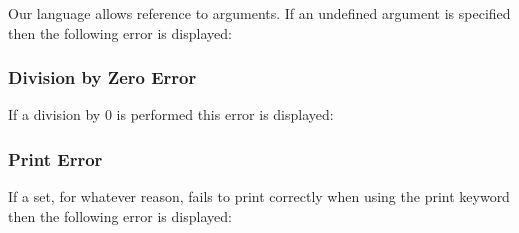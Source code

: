 \documentclass{article}
\begin{document}
Our language allows reference to arguments. If an undefined argument is 
specified then the following error is displayed: \texttt{}

\subsubsection{Division by Zero Error}
If a division by 0 is performed this error is displayed: 
\texttt{}

\subsubsection{Print Error}
If a set, for whatever reason, fails to print correctly when using the print 
keyword then the following error is displayed: 
\texttt{}
\end{document}

